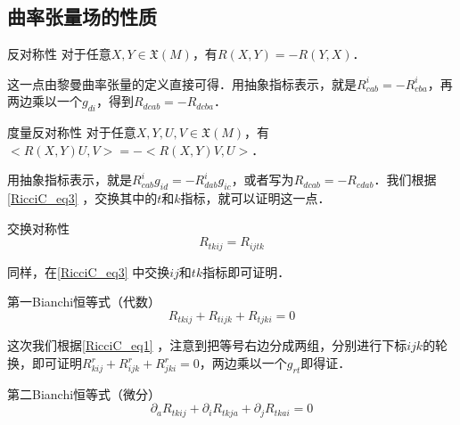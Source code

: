 








\subsection{曲率张量场的性质}

\begin{theorem}{反对称性}
对于任意$X, Y\in\mathfrak{X}(M)$，有$R(X, Y)=-R(Y, X)$．
\end{theorem}


这一点由黎曼曲率张量的定义直接可得．用抽象指标表示，就是$R^i_{cab}=-R^i_{cba}$，再两边乘以一个$g_{di}$，得到$R_{dcab}=-R_{dcba}$．





\begin{theorem}{度量反对称性}
对于任意$X, Y, U, V\in\mathfrak{X}(M)$，有$<R(X, Y)U, V>=-<R(X, Y)V, U>$．


\end{theorem}

用抽象指标表示，就是$R^i_{cab}g_{id}=-R^i_{dab}g_{ic}$，或者写为$R_{dcab}=-R_{cdab}$．我们根据\autoref{RicciC_eq3}  ，交换其中的$t$和$k$指标，就可以证明这一点．

\begin{theorem}{交换对称性}
\begin{equation}\label{RicciC_eq5}
R_{tkij}=R_{ijtk}
\end{equation}
\end{theorem}

同样，在\autoref{RicciC_eq3} 中交换$ij$和$tk$指标即可证明．

\begin{theorem}{第一Bianchi恒等式（代数）}
\begin{equation}\label{RicciC_eq4}
R_{tkij}+R_{tijk}+R_{tjki}=0
\end{equation}
\end{theorem}

这次我们根据\autoref{RicciC_eq1} ，注意到把等号右边分成两组，分别进行下标$ijk$的轮换，即可证明$R^r_{kij}+R^r_{ijk}+R^r_{jki}=0$，两边乘以一个$g_{rt}$即得证．

\begin{theorem}{第二Bianchi恒等式（微分）}
\begin{equation}
\partial_aR_{tkij}+\partial_iR_{tkja}+\partial_jR_{tkai}=0
\end{equation}
\end{theorem}

